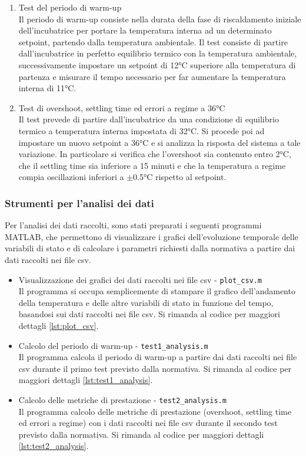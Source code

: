 \begin{enumerate}
	\item Test del periodo di warm-up \\
	Il periodo di warm-up consiste nella durata della fase di riscaldamento iniziale dell'incubatrice per portare la
	temperatura interna ad un determinato setpoint, partendo dalla temperatura ambientale. Il test consiste di partire
	dall'incubatrice in perfetto equilibrio termico con la temperatura ambientale, successivamente impostare un setpoint
	di 12°C superiore alla temperatura di partenza e misurare il tempo necessario per far aumentare la temperatura interna
	di 11°C.
	\item Test di overshoot, settling time ed errori a regime a 36°C \\
	Il test prevede di partire dall'incubatrice da una condizione di equilibrio termico a temperatura interna impostata di
	32°C. Si procede poi ad impostare un nuovo setpoint a 36°C e si analizza la risposta del sistema a tale variazione. In
	particolare si verifica che l'overshoot sia contenuto entro 2°C, che il settling time sia inferiore a 15 minuti e che
	la temperatura a regime compia oscillazioni inferiori a \(\pm\)0.5°C rispetto al setpoint.
\end{enumerate}

\subsubsection{Strumenti per l'analisi dei dati}
Per l'analisi dei dati raccolti, sono stati preparati i seguenti programmi MATLAB, che permettono di visualizzare i grafici
dell'evoluzione temporale delle variabili di stato e di calcolare i parametri richiesti dalla normativa a partire dai dati
raccolti nei file csv.
\begin{itemize}
	\item Visualizzazione dei grafici dei dati raccolti nei file csv - \verb|plot_csv.m|\\
	Il programma si occupa semplicemente di stampare il grafico dell'andamento della temperatura e delle altre variabili
	di stato in funzione del tempo, basandosi sui dati raccolti nei file csv. Si rimanda al codice per maggiori dettagli
	\autoref{lst:plot_csv}.
	\item Calcolo del periodo di warm-up - \verb|test1_analysis.m|\\
	Il programma calcola il periodo di warm-up a partire dai dati raccolti nei file csv durante il primo test previsto
	dalla normativa. Si rimanda al codice per maggiori dettagli \autoref{lst:test1_analysis}.
	\item Calcolo delle metriche di prestazione - \verb|test2_analysis.m|\\
	Il programma calcolo delle metriche di prestazione (overshoot, settling time ed errori a regime) con i dati raccolti
	nei file csv durante il secondo test previsto dalla normativa. Si rimanda al codice per maggiori dettagli
	\autoref{lst:test2_analysis}.
\end{itemize}

